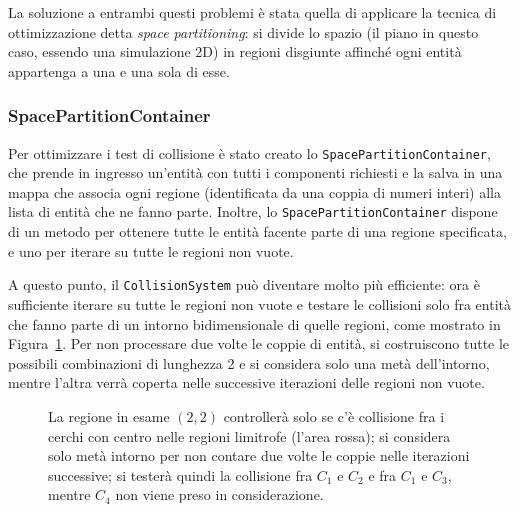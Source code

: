 La soluzione a entrambi questi problemi è stata quella di applicare la tecnica di ottimizzazione detta
\textit{space partitioning}: si divide lo spazio (il piano in questo caso, essendo una simulazione 2D) in regioni disgiunte
affinché ogni entità appartenga a una e una sola di esse.

\subsubsection{SpacePartitionContainer}
Per ottimizzare i test di collisione è stato creato lo \texttt{SpacePartitionContainer}, che prende in ingresso
un'entità con tutti i componenti richiesti e la salva in una mappa che associa ogni regione (identificata da una coppia
di numeri interi) alla lista di entità che ne fanno parte.
Inoltre, lo \texttt{SpacePartitionContainer} dispone di un metodo per ottenere tutte le entità facente parte di una regione
specificata, e uno per iterare su tutte le regioni non vuote.

A questo punto, il \texttt{CollisionSystem} può diventare molto più efficiente: ora è sufficiente iterare su tutte le regioni
non vuote e testare le collisioni solo fra entità che fanno parte di un intorno bidimensionale di quelle regioni, come
mostrato in Figura~\ref{fig:space-partition}.
Per non processare due volte le coppie di entità, si costruiscono tutte le possibili combinazioni di lunghezza 2 e si
considera solo una metà dell'intorno, mentre l'altra verrà coperta nelle successive iterazioni delle regioni non vuote.

\begin{figure}[htp]
    \centering
    \caption{La regione in esame $(2, 2)$ controllerà solo se c'è collisione fra i cerchi con centro nelle regioni limitrofe (l'area rossa);
    si considera solo metà intorno per non contare due volte le coppie nelle iterazioni successive;
    si testerà quindi la collisione fra $C_1$ e $C_2$ e fra $C_1$ e $C_3$, mentre $C_4$ non viene preso in considerazione.}
    \label{fig:space-partition}
\end{figure}